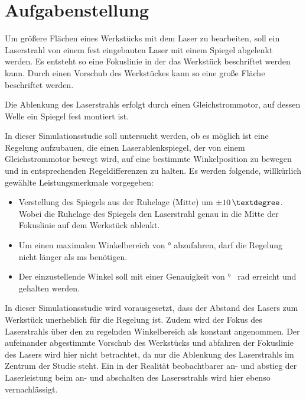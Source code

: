 \newpage




\chapter{Aufgabenstellung}
\label{chap:Aufgabenstellung}

Um größere Flächen eines Werkstücks mit dem Laser zu bearbeiten, soll ein Laserstrahl von einem fest eingebauten Laser mit einem Spiegel abgelenkt werden.
Es entsteht so eine Fokuslinie in der das Werkstück beschriftet werden kann. Durch einen Vorschub des Werkstückes kann so eine große Fläche beschriftet werden.

Die Ablenkung des Laserstrahls erfolgt durch einen Gleichstrommotor, auf dessen Welle ein Spiegel fest montiert ist.

In dieser Simulationsstudie soll untersucht werden, ob es möglich ist eine Regelung aufzubauen, die einen Laserablenkspiegel, der von einem Gleichstrommotor bewegt wird, 
auf eine bestimmte Winkelposition zu bewegen und in entsprechenden Regeldifferenzen zu halten.
Es werden folgende, willkürlich gewählte Leistungsmerkmale vorgegeben:
\begin{itemize}
\item  Verstellung des Spiegels aus der Ruhelage (Mitte) um $\unit[\pm10]{°}$. 
Wobei die Ruhelage des Spiegels den Laserstrahl genau in die Mitte der Fokuslinie auf dem Werkstück ablenkt.
\item  Um einen maximalen Winkelbereich von \unit[20]{°} abzufahren, darf die Regelung nicht länger als \unit[1]{ms} benötigen.
\item Der einzustellende Winkel soll mit einer Genauigkeit von \unit[1e-3]{°} \approx \unit[17]{\mu rad} erreicht und gehalten werden.
\end{itemize}


In dieser Simulationsstudie wird vorausgesetzt, dass der Abstand des Lasers zum Werkstück unerheblich für die Regelung ist. 
Zudem wird der Fokus des Laserstrahls über den zu regelnden Winkelbereich als konstant angenommen.
Der aufeinander abgestimmte Vorschub des Werkstücks und abfahren der Fokuslinie des Lasers wird hier nicht betrachtet, da nur die Ablenkung des Laserstrahls im Zentrum der 
Studie steht.
Ein in der Realität beobachtbarer an- und abstieg der Laserleistung beim an- und abschalten des Lasersstrahls wird hier ebenso vernachlässigt.


